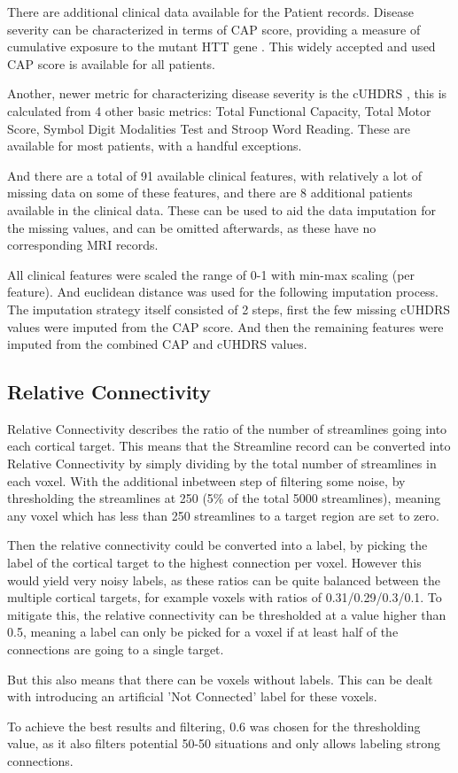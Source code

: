 There are additional clinical data available for the Patient records. Disease severity can be characterized in terms of \ac{CAP} score, providing a measure of cumulative exposure to the mutant HTT gene \cite{cap}. This widely accepted and used \ac{CAP} score is available for all patients.\par
Another, newer metric for characterizing disease severity is the \ac{cUHDRS} \cite{uhdrs}, this is calculated from 4 other basic metrics: Total Functional Capacity, Total Motor Score, Symbol Digit Modalities Test and Stroop Word Reading. These are available for most patients, with a handful exceptions.\par
And there are a total of 91 available clinical features, with relatively a lot of missing data on some of these features, and there are 8 additional patients available in the clinical data. These can be used to aid the data imputation for the missing values, and can be omitted afterwards, as these have no corresponding \ac{MRI} records.\par
All clinical features were scaled the range of 0-1 with min-max scaling (per feature). And euclidean distance was used for the following imputation process. The imputation strategy itself consisted of 2 steps, first the few missing \ac{cUHDRS} values were imputed from the \ac{CAP} score. And then the remaining features were imputed from the combined \ac{CAP} and \ac{cUHDRS} values.

\subsection{Relative Connectivity}
\label{sec:conpre}

Relative Connectivity describes the ratio of the number of streamlines going into each cortical target. This means that the Streamline record can be converted into Relative Connectivity by simply dividing by the total number of streamlines in each voxel. With the additional inbetween step of filtering some noise, by thresholding the streamlines at 250 (5\% of the total 5000 streamlines), meaning any voxel which has less than 250 streamlines to a target region are set to zero.\par
Then the relative connectivity could be converted into a label, by picking the label of the cortical target to the highest connection per voxel. However this would yield very noisy labels, as these ratios can be quite balanced between the multiple cortical targets, for example voxels with ratios of 0.31/0.29/0.3/0.1. To mitigate this, the relative connectivity can be thresholded at a value higher than 0.5, meaning a label can only be picked for a voxel if at least half of the connections are going to a single target.\par
But this also means that there can be voxels without labels. This can be dealt with introducing an artificial 'Not Connected' label for these voxels.\par
To achieve the best results and filtering, 0.6 was chosen for the thresholding value, as it also filters potential 50-50 situations and only allows labeling strong connections.

